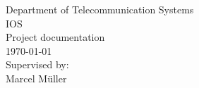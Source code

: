 \begin{titlepage}
\begin{center}
		Department of Telecommunication Systems\\
		IOS\\
		\vspace{0.5cm}
		Project documentation\\
		\vspace{2.2cm}
		\today\\
		\vspace{2.0cm}
		\large
		Supervised by:\\
    	Marcel Müller\\
		\vspace{1cm}
		\end{center}
\end{titlepage}

\shipout\null
\shipout\null